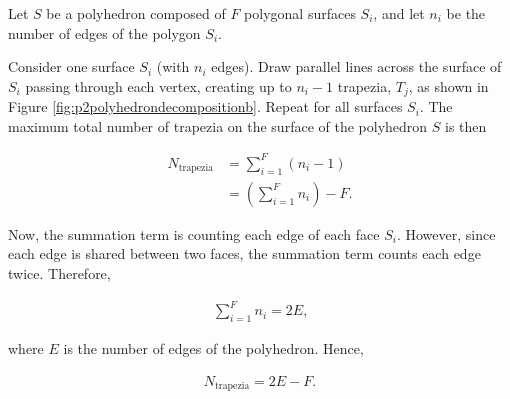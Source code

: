 Let \(S\) be a polyhedron composed of \(F\) polygonal surfaces \(S_{\!i}\), and let \(n_i\) be the number of edges of the polygon \(S_{\!i}\).

Consider one surface \(S_{\!i}\) (with \(n_i\) edges). Draw parallel lines across the surface of \(S_{\!i}\) passing through each vertex, creating up to \(n_i-1\) trapezia, \(T_{\!j}\), as shown in Figure \ref{fig:p2polyhedrondecompositionb}. Repeat for all surfaces \(S_{\!i}\). The maximum total number of trapezia on the surface of the polyhedron \(S\) is then

\begin{align*}
N_{\text{trapezia}} &= \sum_{i=1}^F \left( n_i - 1\right) \\
&= \left( \sum_{i=1}^F n_i\right) - F \text{.}
\end{align*}

Now, the summation term is counting each edge of each face \(S_{\!i}\). However, since each edge is shared between two faces, the summation term counts each edge twice. Therefore,

\begin{align*}
\sum_{i=1}^F n_i = 2E \text{,}
\end{align*}

\noindent where \(E\) is the number of edges of the polyhedron. Hence,

\begin{align*}
N_{\text{trapezia}} = 2E - F \text{.}
\end{align*}